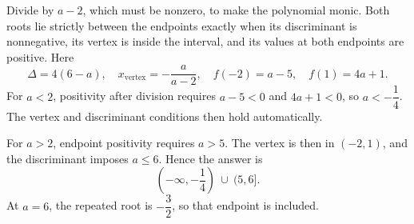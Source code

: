 Divide by $a-2$, which must be nonzero, to make the polynomial monic. Both roots lie strictly between the endpoints exactly when its discriminant is nonnegative, its vertex is inside the interval, and its values at both endpoints are positive. Here
\[
\Delta=4(6-a),\quad x_{\mathrm{vertex}}=-\dfrac{a}{a-2},\quad
f(-2)=a-5,\quad f(1)=4a+1.
\]
For $a<2$, positivity after division requires $a-5<0$ and $4a+1<0$, so $a<-\dfrac{1}{4}$. The vertex and discriminant conditions then hold automatically.

For $a>2$, endpoint positivity requires $a>5$. The vertex is then in $(-2,1)$, and the discriminant imposes $a\le6$. Hence the answer is
\[
\boxed{(-\infty,-\dfrac{1}{4})\ \cup\ (5,6]}.
\]
At $a=6$, the repeated root is $-\dfrac{3}{2}$, so that endpoint is included.
